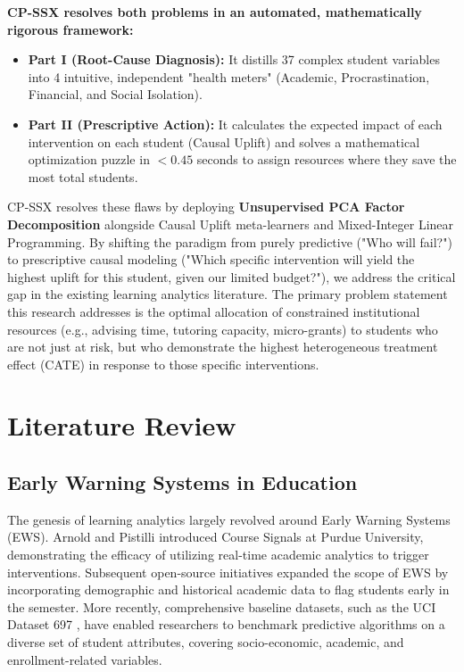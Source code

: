 \documentclass[11pt, a4paper]{article}
\begin{document}
\textbf{CP-SSX resolves both problems in an automated, mathematically rigorous framework:}
\begin{itemize}
    \item \textbf{Part I (Root-Cause Diagnosis):} It distills 37 complex student variables into 4 intuitive, independent "health meters" (Academic, Procrastination, Financial, and Social Isolation).
    \item \textbf{Part II (Prescriptive Action):} It calculates the expected impact of each intervention on each student (Causal Uplift) and solves a mathematical optimization puzzle in $<0.45$ seconds to assign resources where they save the most total students.
\end{itemize}

CP-SSX resolves these flaws by deploying \textbf{Unsupervised PCA Factor Decomposition} alongside Causal Uplift meta-learners and Mixed-Integer Linear Programming. By shifting the paradigm from purely predictive ("Who will fail?") to prescriptive causal modeling ("Which specific intervention will yield the highest uplift for this student, given our limited budget?"), we address the critical gap in the existing learning analytics literature. The primary problem statement this research addresses is the optimal allocation of constrained institutional resources (e.g., advising time, tutoring capacity, micro-grants) to students who are not just at risk, but who demonstrate the highest heterogeneous treatment effect (CATE) in response to those specific interventions.

\section{Literature Review}

\subsection{Early Warning Systems in Education}
The genesis of learning analytics largely revolved around Early Warning Systems (EWS). Arnold and Pistilli \cite{arnold2012course} introduced Course Signals at Purdue University, demonstrating the efficacy of utilizing real-time academic analytics to trigger interventions. Subsequent open-source initiatives \cite{jayaprakash2014early} expanded the scope of EWS by incorporating demographic and historical academic data to flag students early in the semester. More recently, comprehensive baseline datasets, such as the UCI Dataset 697 \cite{realinho2022predicting}, have enabled researchers to benchmark predictive algorithms on a diverse set of student attributes, covering socio-economic, academic, and enrollment-related variables.
\end{document}
